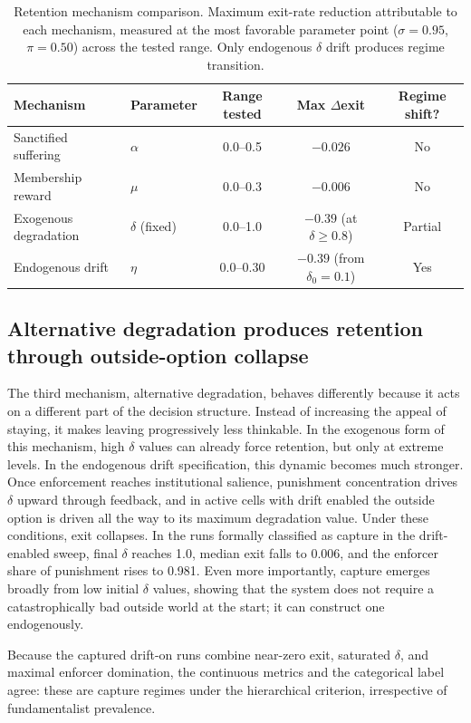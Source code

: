 \documentclass[12pt]{article}
\begin{document}
\begin{table}[ht]
\centering
\caption{Retention mechanism comparison. Maximum exit-rate reduction attributable to each mechanism, measured at the most favorable parameter point ($\sigma = 0.95$, $\pi = 0.50$) across the tested range. Only endogenous $\delta$ drift produces regime transition.}
\label{tab:retention}
\begin{tabular}{llccc}
\toprule
Mechanism & Parameter & Range tested & Max $\Delta$exit & Regime shift? \\
\midrule
Sanctified suffering & $\alpha$ & 0.0--0.5 & $-0.026$ & No \\
Membership reward & $\mu$ & 0.0--0.3 & $-0.006$ & No \\
Exogenous degradation & $\delta$ (fixed) & 0.0--1.0 & $-0.39$ (at $\delta \geq 0.8$) & Partial \\
Endogenous drift & $\eta$ & 0.0--0.30 & $-0.39$ (from $\delta_0 = 0.1$) & Yes \\
\bottomrule
\end{tabular}
\end{table}

\subsection{Alternative degradation produces retention through outside-option collapse}

The third mechanism, alternative degradation, behaves differently because it acts on a different part of the decision structure. Instead of increasing the appeal of staying, it makes leaving progressively less thinkable. In the exogenous form of this mechanism, high $\delta$ values can already force retention, but only at extreme levels. In the endogenous drift specification, this dynamic becomes much stronger. Once enforcement reaches institutional salience, punishment concentration drives $\delta$ upward through feedback, and in active cells with drift enabled the outside option is driven all the way to its maximum degradation value. Under these conditions, exit collapses. In the runs formally classified as capture in the drift-enabled sweep, final $\delta$ reaches 1.0, median exit falls to 0.006, and the enforcer share of punishment rises to 0.981. Even more importantly, capture emerges broadly from low initial $\delta$ values, showing that the system does not require a catastrophically bad outside world at the start; it can construct one endogenously.

Because the captured drift-on runs combine near-zero exit, saturated $\delta$, and maximal enforcer domination, the continuous metrics and the categorical label agree: these are capture regimes under the hierarchical criterion, irrespective of fundamentalist prevalence.
\end{document}
